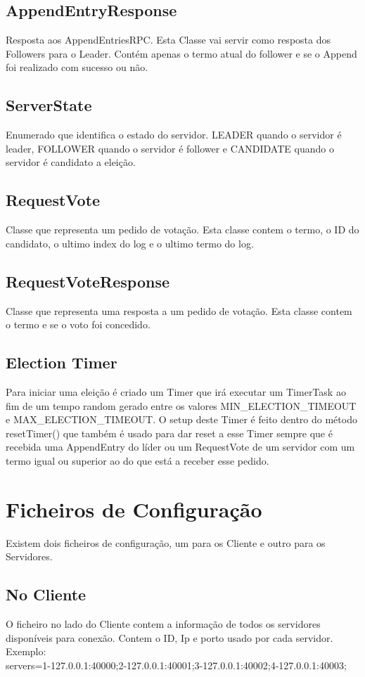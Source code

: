 \documentclass[12pt,a4paper]{report}
\begin{document}
\subsection{AppendEntryResponse}
Resposta aos AppendEntriesRPC. Esta Classe vai servir como resposta dos Followers para o Leader. Contém apenas o termo atual do follower e se o Append foi realizado com sucesso ou não.

\subsection{ServerState}
Enumerado que identifica o estado do servidor. LEADER quando o servidor é leader, FOLLOWER quando o servidor é follower e CANDIDATE quando o servidor é candidato a eleição.

\subsection{RequestVote}
Classe que representa um pedido de votação. Esta classe contem o termo, o ID do candidato, o ultimo index do log e o ultimo termo do log.

\subsection{RequestVoteResponse}
Classe que representa uma resposta a um pedido de votação. Esta classe contem o termo e se o voto foi concedido.
\subsection{Election Timer}
Para iniciar uma eleição é criado um Timer que irá executar um TimerTask ao fim de um tempo random gerado entre os valores MIN\_ELECTION\_TIMEOUT e MAX\_ELECTION\_TIMEOUT. O setup deste Timer é feito dentro do método resetTimer() que também é usado para dar reset a esse Timer sempre que é recebida uma AppendEntry do líder ou um RequestVote de um servidor com um termo igual ou superior ao do que está a receber esse pedido.

\newpage
\section{Ficheiros de Configuração}
Existem dois ficheiros de configuração, um para os Cliente e outro para os Servidores.
\subsection{No Cliente}
O ficheiro no lado do Cliente contem a informação de todos os servidores disponíveis para conexão. Contem o ID, Ip e porto usado por cada servidor.\\
Exemplo: \\
servers=1-127.0.0.1:40000;2-127.0.0.1:40001;3-127.0.0.1:40002;4-127.0.0.1:40003;
\end{document}
